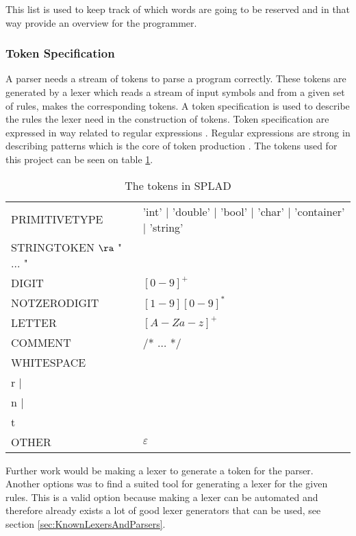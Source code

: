 This list is used to keep track of which words are going to be reserved and in that way provide an overview for the programmer. 

\subsubsection{Token Specification}
A parser needs a stream of tokens to parse a program correctly. These tokens are generated by a lexer which reads a stream of input symbols and from a given set of rules, makes the corresponding tokens. A token specification is used to describe the rules the lexer need in the construction of tokens. Token specification are expressed in way related to regular expressions \citep{sebesta}. Regular expressions are strong in describing patterns which is the core of token production \citep{sipser}. The tokens used for this project can be seen on table \ref{tab:tokens}.

\begin{table}[H]
\begin{tabular}{l l}
PRIMITIVETYPE & 'int' | 'double' | 'bool' | 'char' | 'container' | 'string' \\
STRINGTOKEN $\ra$ " $\dots$  " \\
DIGIT & $[0 - 9]^+$ \\
NOTZERODIGIT & $[1-9][0-9]^*$ \\
LETTER & $[A-Za-z]^+$\\
COMMENT & /* $\dots$ */ \\
WHITESPACE & \\r | \\n | \\t \\
OTHER & $\varepsilon$ \\
\end{tabular}
\caption{The tokens in SPLAD}
\label{tab:tokens}
\end{table}

Further work would be making a lexer to generate a token for the parser. Another options was to find a suited tool for generating a lexer for the given rules. This is a valid option because making a lexer can be automated and therefore already exists a lot of good lexer generators that can be used, see section \ref{sec:KnownLexersAndParsers}.